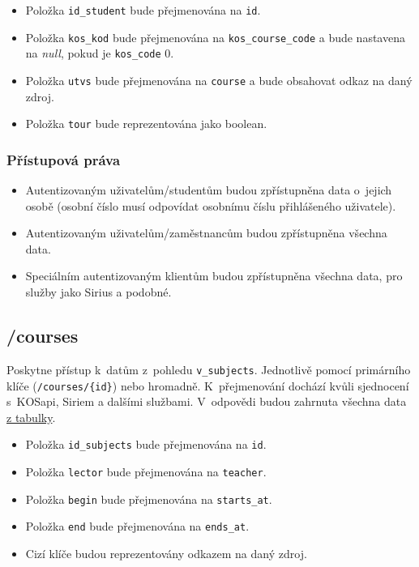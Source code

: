 \begin{itemize}
\tightlist
\item
  Položka \verb!id_student! bude přejmenována na \verb!id!.
\item
  Položka \verb!kos_kod! bude přejmenována na \verb!kos_course_code! a bude nastavena na \emph{null}, pokud je \verb!kos_code! 0.
\item
  Položka \verb!utvs! bude přejmenována na \verb!course! a bude obsahovat odkaz na daný zdroj.
\item
  Položka \verb!tour! bude reprezentována jako boolean.
\end{itemize}

\subsubsection*{Přístupová práva}\label{pux159uxedstupovuxe1-pruxe1va}

\begin{itemize}
\tightlist
\item
  Autentizovaným uživatelům/studentům budou zpřístupněna data o~jejich osobě (osobní číslo musí odpovídat osobnímu číslu přihlášeného uživatele).
\item
  Autentizovaným uživatelům/zaměstnancům budou zpřístupněna všechna data.
\item
  Speciálním autentizovaným klientům budou zpřístupněna všechna data, pro služby jako Sirius a podobné.
\end{itemize}

\subsection{/courses}\label{courses}

Poskytne přístup k~datům z~pohledu \verb!v_subjects!. Jednotlivě pomocí primárního klíče (\verb!/courses/{id}!) nebo hromadně. K~přejmenování dochází kvůli sjednocení s~KOSapi, Siriem a dalšími službami. V~odpovědi budou zahrnuta všechna data \protect\hyperlink{tab:subjects}{z tabulky}.

\begin{itemize}
\tightlist
\item
  Položka \verb!id_subjects! bude přejmenována na \verb!id!.
\item
  Položka \verb!lector! bude přejmenována na \verb!teacher!.
\item
  Položka \verb!begin! bude přejmenována na \verb!starts_at!.
\item
  Položka \verb!end! bude přejmenována na \verb!ends_at!.
\item
  Cizí klíče budou reprezentovány odkazem na daný zdroj.
\end{itemize}

